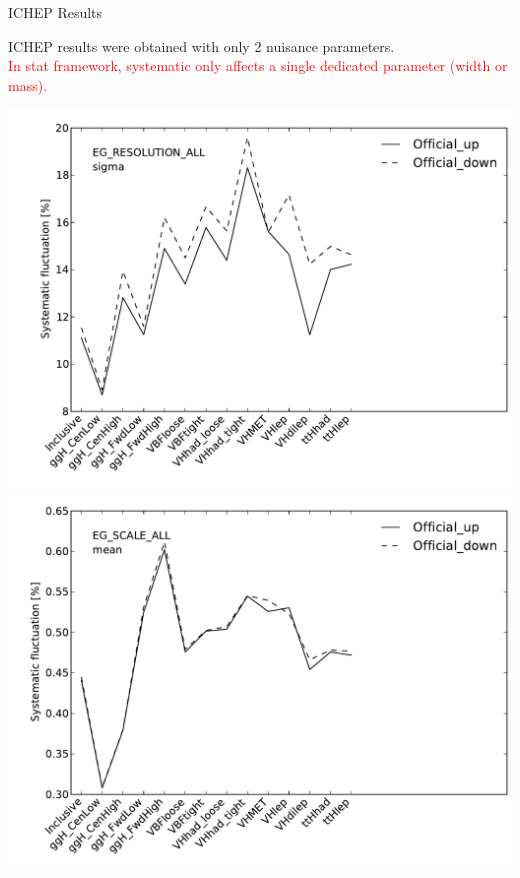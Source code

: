 \begin{frame}{ICHEP Results}
  \begin{minipage}{0.59\linewidth}
    ICHEP results were obtained with only 2 nuisance parameters.\\
    \textcolor{red}{In stat framework, systematic only affects a single dedicated parameter (width or mass).}\\
    
    \vfill
  \end{minipage}
  \begin{minipage}{0.4\linewidth}
    \includegraphics[width=\linewidth]{plots/h013_ICHEP_PhotonSyst_EG_RESOLUTION_ALL_sigma.pdf}\\
    \includegraphics[width=\linewidth]{plots/h013_ICHEP_PhotonSyst_EG_SCALE_ALL_mean.pdf}\\
  \end{minipage}
\end{frame}

